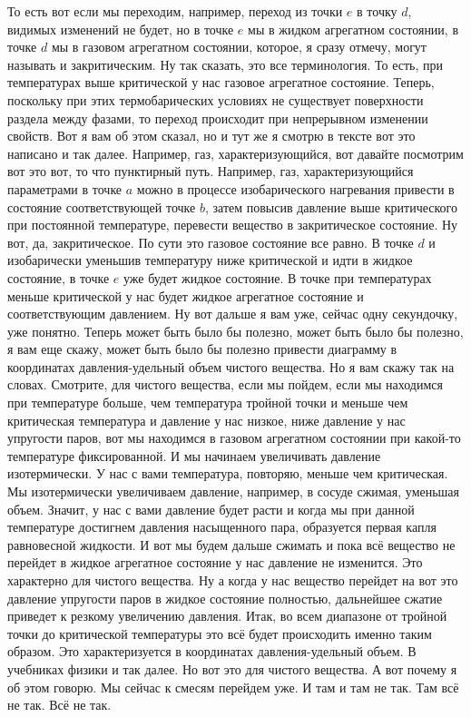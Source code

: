 \documentclass[main.tex]{subfiles}
\begin{document}
То есть вот если мы переходим, например, переход из точки $e$ в точку $d$, видимых изменений не будет, но в точке $e$ мы
в жидком агрегатном состоянии, в точке $d$ мы в газовом агрегатном
состоянии, которое, я сразу отмечу, могут называть и закритическим.
Ну так сказать, это все терминология.
То есть, при температурах выше критической у нас газовое агрегатное состояние.
Теперь, поскольку при этих термобарических условиях не существует поверхности раздела между фазами, то переход происходит при непрерывном изменении свойств.
Вот я вам об этом сказал, но и тут же я смотрю в тексте вот это написано и так далее.
Например, газ, характеризующийся, вот давайте посмотрим вот это вот, то что пунктирный путь.
Например, газ, характеризующийся параметрами в точке $a$ можно в процессе изобарического нагревания привести в состояние соответствующей точке $b$, затем повысив давление выше критического при постоянной температуре, перевести вещество в закритическое состояние.
Ну вот, да, закритическое.
По сути это газовое состояние все равно.
В точке $d$ и изобарически уменьшив температуру ниже критической и идти в жидкое состояние, в точке $e$ уже будет жидкое состояние.
В точке при температурах меньше критической у нас будет жидкое агрегатное состояние и соответствующим давлением.
Ну вот дальше я вам уже, сейчас одну секундочку, уже понятно.
Теперь может быть было бы полезно, может быть было бы полезно, я вам еще скажу, может быть было бы полезно привести диаграмму в координатах давления-удельный объем чистого вещества.
Но я вам скажу так на словах.
Смотрите, для чистого вещества, если мы пойдем, если мы находимся при температуре больше, чем температура тройной точки и меньше чем критическая температура и давление у нас низкое, ниже давление у нас упругости паров, вот мы находимся в газовом агрегатном состоянии
при какой-то температуре фиксированной.
И мы начинаем увеличивать давление изотермически.
У нас с вами температура, повторяю, меньше чем критическая.
Мы изотермически увеличиваем давление, например, в сосуде сжимая, уменьшая объем.
Значит, у нас с вами давление будет расти и когда мы при данной температуре достигнем давления насыщенного пара, образуется первая капля равновесной жидкости.
И вот мы будем дальше сжимать и пока всё вещество не перейдет в жидкое агрегатное состояние у нас давление не изменится.
Это характерно для чистого вещества.
Ну а когда у нас вещество перейдет на вот это давление упругости паров в жидкое состояние полностью, дальнейшее сжатие приведет к резкому увеличению давления.
Итак, во всем диапазоне от тройной точки до критической температуры это всё будет происходить именно таким образом.
Это характеризуется в координатах давления-удельный объем.
В учебниках физики и так далее.
Но вот это для чистого вещества.
А вот почему я об этом говорю.
Мы сейчас к смесям перейдем уже.
И там и там не так.
Там всё не так.
Всё не так.
\end{document}
